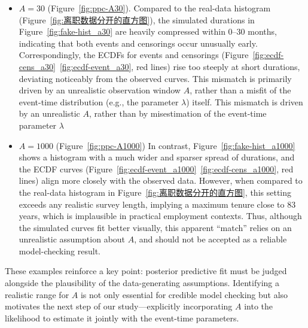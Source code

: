 \begin{itemize}
    \item $A = 30$ (Figure~\ref{fig:ppc-A30}). Compared to the real-data histogram (Figure~\ref{fig:离职数据分开的直方图}), the simulated durations in Figure~\ref{fig:fake-hist_a30} are heavily compressed within 0–30 months, indicating that both events and censorings occur unusually early. Correspondingly, the ECDFs for events and censorings (Figure~\ref{fig:ecdf-cens_a30}~\ref{fig:ecdf-event_a30}, red lines) rise too steeply at short durations, deviating noticeably from the observed curves. This mismatch is primarily driven by an unrealistic observation window $A$, rather than a misfit of the event-time distribution (e.g., the parameter $\lambda$) itself. This mismatch is driven by an unrealistic $A$, rather than by misestimation of the event-time parameter $\lambda$
    \item $A = 1000$ (Figure~\ref{fig:ppc-A1000})
  In contrast, Figure~\ref{fig:fake-hist_a1000} shows a histogram with a much wider and sparser spread of durations, and the ECDF curves (Figure~\ref{fig:ecdf-event_a1000}~\ref{fig:ecdf-cens_a1000}, red lines) align more closely with the observed data. However, when compared to the real-data histogram in Figure~\ref{fig:离职数据分开的直方图}, this setting exceeds any realistic survey length, implying a maximum tenure close to 83 years, which is implausible in practical employment contexts. Thus, although the simulated curves fit better visually, this apparent “match” relies on an unrealistic assumption about $A$, and should not be accepted as a reliable model-checking result.
\end{itemize}
These examples reinforce a key point: posterior predictive fit must be judged alongside the plausibility of the data-generating assumptions. Identifying a realistic range for $A$ is not only essential for credible model checking but also motivates the next step of our study—explicitly incorporating $A$ into the likelihood to estimate it jointly with the event-time parameters.
